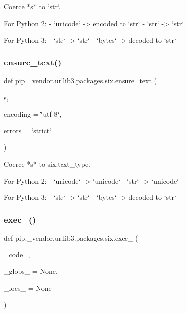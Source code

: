 \begin{DoxyVerb}Coerce *s* to `str`.

For Python 2:
  - `unicode` -> encoded to `str`
  - `str` -> `str`

For Python 3:
  - `str` -> `str`
  - `bytes` -> decoded to `str`
\end{DoxyVerb}
 \mbox{\label{namespacepip_1_1__vendor_1_1urllib3_1_1packages_1_1six_ae478cd0f9b05f392322a70cb1cc3f9d1}} 
\subsubsection{\texorpdfstring{ensure\+\_\+text()}{ensure\_text()}}
{\footnotesize\ttfamily def pip.\+\_\+vendor.\+urllib3.\+packages.\+six.\+ensure\+\_\+text (\begin{DoxyParamCaption}\item[{}]{s,  }\item[{}]{encoding = {\ttfamily \char`\"{}utf-\/8\char`\"{}},  }\item[{}]{errors = {\ttfamily \char`\"{}strict\char`\"{}} }\end{DoxyParamCaption})}

\begin{DoxyVerb}Coerce *s* to six.text_type.

For Python 2:
  - `unicode` -> `unicode`
  - `str` -> `unicode`

For Python 3:
  - `str` -> `str`
  - `bytes` -> decoded to `str`
\end{DoxyVerb}
 \mbox{\label{namespacepip_1_1__vendor_1_1urllib3_1_1packages_1_1six_abf74c509b706e8e92b4d4bad42923615}} 
\subsubsection{\texorpdfstring{exec\+\_\+()}{exec\_()}}
{\footnotesize\ttfamily def pip.\+\_\+vendor.\+urllib3.\+packages.\+six.\+exec\+\_\+ (\begin{DoxyParamCaption}\item[{}]{\+\_\+code\+\_\+,  }\item[{}]{\+\_\+globs\+\_\+ = {\ttfamily None},  }\item[{}]{\+\_\+locs\+\_\+ = {\ttfamily None} }\end{DoxyParamCaption})}

